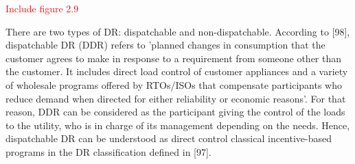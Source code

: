 \textcolor{red}{Include figure 2.9}

There are two types of DR: dispatchable and non-dispatchable. According to [98], dispatchable DR (DDR) refers to 'planned changes in consumption that the customer agrees to make in response to a requirement from someone other than the customer. It includes direct load control of customer appliances and a variety of wholesale programs offered by RTOs/ISOs that compensate participants who reduce demand when directed for either reliability or economic reasons'. For that reason, DDR can be considered as the participant giving
the control of the loads to the utility, who is in charge of its management depending on the needs. Hence, dispatchable DR can be understood as direct control classical incentive-based programs in the DR classification defined in [97].

